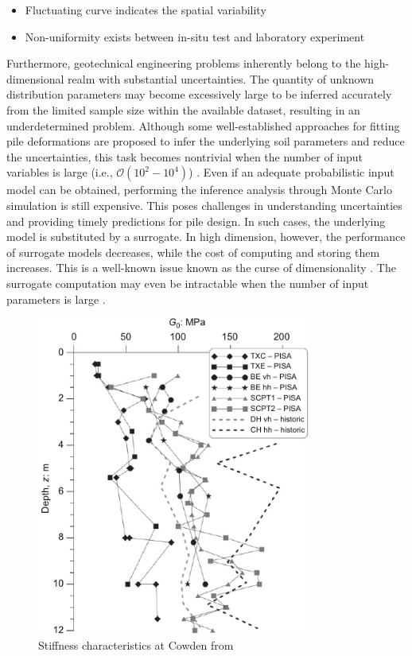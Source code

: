 
\begin{itemize}[left=0pt]

    \item Fluctuating curve indicates the spatial  variability
    \item Non-uniformity exists between in-situ test and laboratory experiment

\end{itemize}
\vspace{0.2cm}

Furthermore, geotechnical engineering problems inherently belong to the high-dimensional realm with substantial uncertainties. The quantity of unknown distribution parameters may become excessively large to be inferred accurately from the limited sample size within the available dataset, resulting in an underdetermined problem. Although some well-established approaches for fitting pile deformations are proposed to infer the underlying soil parameters and  reduce the uncertainties, this task becomes nontrivial when the number of input variables is large (i.e., $\mathcal{O}(10^2-10^4)$) \citep{lataniotis2019}. 
Even if an adequate probabilistic input model can be obtained, performing the inference analysis  through Monte Carlo simulation is still expensive. This poses challenges in understanding uncertainties and providing timely predictions for pile design.
 In such cases, the underlying model is substituted by a surrogate. In high dimension, however,
the performance of surrogate models decreases, while the cost of computing and storing them increases. This is a well-known issue known as the curse
of dimensionality \citep{verleysen2005}. The surrogate computation
may even be intractable when the number of input parameters is large \citep{lataniotis2019}.


\begin{figure}[htbp]
    \center
    \includegraphics[width = 90mm]{Figures/figure-Cowden.pdf}
    \caption{Stiffness characteristics at Cowden from \protect\cite{zdravkovic2020}}
    \label{fig: Cowden_cpt}
\end{figure}

